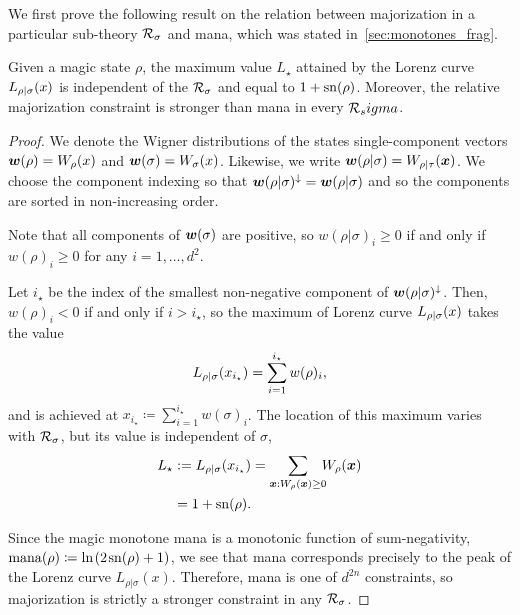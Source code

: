 \documentclass[pra,
aps,
twocolumn,
superscriptaddress,
groupedaddress,
nofootinbib,
reprint
]{revtex4-1}
\begin{document}
We first prove the following result on the relation between majorization in a particular sub-theory ${\mathcal R}_\sigma$ and mana, which was stated in~\cref{sec:monotones_frag}.
\begingroup
\def\thetheorem{\ref{lem:lcmax}}
\begin{theorem}
	Given a magic state $\rho$, the maximum value $L_\star$ attained by the Lorenz curve ${L_{\rho|\sigma}}(x)$ is independent of the ${\mathcal R}_\sigma$ and equal to $1+{{\rm{sn}}(\rho)}$. Moreover, the relative majorization constraint is stronger than mana in every ${\mathcal R}_sigma$.
\end{theorem}
\addtocounter{theorem}{-1}
\endgroup
\begin{proof}
	We denote the Wigner distributions of the states single-component vectors $\boldsymbol{w}(\rho)=W_\rho(x)$ and $ \boldsymbol{w}(\sigma)=W_\sigma(x)$. Likewise, we write $\boldsymbol{w}(\rho|\sigma) = W_{\rho|\tau}(\boldsymbol{x})$.
	We choose the component indexing so that $\boldsymbol{w}(\rho|\sigma)^\downarrow = \boldsymbol{w}(\rho|\sigma)$ and so the components are sorted in non-increasing order.

Note that all components of $\bm{w}(\sigma)$ are positive, so $w(\rho|\sigma)_i \geq 0$ if and only if $w(\rho)_i \geq 0$ for any $i=1,\dots,d^2$.
	
	Let $i_\star$ be the index of the smallest non-negative component of $\boldsymbol{w}(\rho|\sigma)^\downarrow$.
	Then, $w(\rho)_i < 0$ if and only if $i > i_\star$, so the maximum of Lorenz curve ${L_{\rho|\sigma}}(x)$ takes the value 
	\begin{equation}
		{L_{\rho|\sigma}}(x_{i_\star}) = \sum_{i=1}^{i_\star} w(\rho)_i,
	\end{equation}
	and is achieved at $x_{i_\star} \coloneqq \sum_{i=1}^{i_\star} w(\sigma)_i$. The location of this maximum varies with ${\mathcal R}_\sigma$, but its value is independent of $\sigma$,
	\begin{align}
	L_\star &:=	\lc{\rho}{\sigma}(x_{i_\star}) 
		= \sum\limits_{\bmx: \W[\bmx]{\rho} \geq 0}\hspace{-5pt} \W[\bmx]{\rho} \nonumber \\
		&= 1 + \sn{\rho}.
	\end{align}
	
Since the magic monotone mana is a monotonic function of sum-negativity, $\rm{mana}(\rho) \coloneqq \ln \hspace{1pt}(2\hspace{1pt}{{\rm{sn}}(\rho)}+1)$, we see that mana corresponds precisely to the peak of the Lorenz curve $L_{\rho|\sigma}(x)$. Therefore, mana is one of $d^{2n}$ constraints, so majorization is strictly a stronger constraint in any ${\mathcal R}_\sigma$.
\end{proof}
\end{document}
